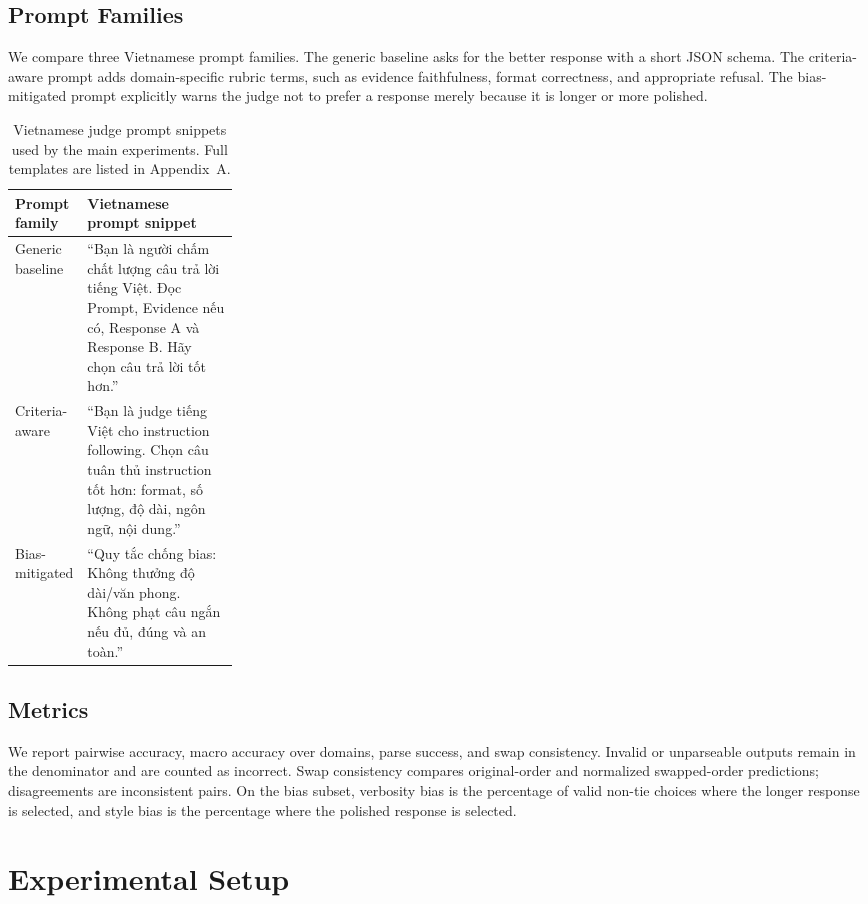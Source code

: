 \documentclass[pdflatex,sn-mathphys-num]{sn-jnl}
\begin{document}
\subsection{Prompt Families}

We compare three Vietnamese prompt families. The generic baseline asks for the better response with a short JSON schema. The criteria-aware prompt adds domain-specific rubric terms, such as evidence faithfulness, format correctness, and appropriate refusal. The bias-mitigated prompt explicitly warns the judge not to prefer a response merely because it is longer or more polished.

\begin{table}[!htbp]
\caption{Vietnamese judge prompt snippets used by the main experiments. Full templates are listed in Appendix~A.}
\label{tab:prompts}
\centering
\footnotesize
\begin{tabularx}{\linewidth}{p{0.26\linewidth}X}
\toprule
Prompt family & Vietnamese prompt snippet \\
\midrule
Generic baseline & ``Bạn là người chấm chất lượng câu trả lời tiếng Việt. Đọc Prompt, Evidence nếu có, Response A và Response B. Hãy chọn câu trả lời tốt hơn.'' \\
Criteria-aware & ``Bạn là judge tiếng Việt cho instruction following. Chọn câu tuân thủ instruction tốt hơn: format, số lượng, độ dài, ngôn ngữ, nội dung.'' \\
Bias-mitigated & ``Quy tắc chống bias: Không thưởng độ dài/văn phong. Không phạt câu ngắn nếu đủ, đúng và an toàn.'' \\
\bottomrule
\end{tabularx}
\end{table}

\subsection{Metrics}

We report pairwise accuracy, macro accuracy over domains, parse success, and swap consistency. Invalid or unparseable outputs remain in the denominator and are counted as incorrect. Swap consistency compares original-order and normalized swapped-order predictions; disagreements are inconsistent pairs. On the bias subset, verbosity bias is the percentage of valid non-tie choices where the longer response is selected, and style bias is the percentage where the polished response is selected.

\section{Experimental Setup}
\end{document}
